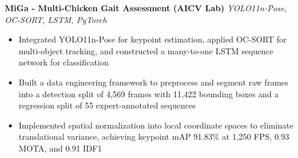 \documentclass[letterpaper,10pt]{article}
\newenvironment{resumeitems}{\begin{itemize}}{\end{itemize}}
\newcommand{\SecondProjectTitle}{MiGa - Multi-Chicken Gait Assessment (AICV Lab)}
\newcommand{\SecondProjectContext}{YOLO11n-Pose, OC-SORT, LSTM, PyTorch}
\newcommand{\SecondProjectBulletOne}{Integrated YOLO11n-Pose for keypoint estimation, applied OC-SORT for multi-object tracking, and constructed a many-to-one LSTM sequence network for classification}
\newcommand{\SecondProjectBulletTwo}{Built a data engineering framework to preprocess and segment raw frames into a detection split of 4,569 frames with 11,422 bounding boxes and a regression split of 55 expert-annotated sequences}
\newcommand{\SecondProjectBulletThree}{Implemented spatial normalization into local coordinate spaces to eliminate translational variance, achieving keypoint mAP 91.83\% at 1,250 FPS, 0.93 MOTA, and 0.91 IDF1}
\begin{document}
\textbf{\SecondProjectTitle} \hfill \textit{\SecondProjectContext}
\begin{resumeitems}
\item \SecondProjectBulletOne
\item \SecondProjectBulletTwo
\item \SecondProjectBulletThree
\end{resumeitems}
\end{document}
